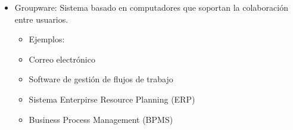 \begin{itemize}
\begin{itemize}
\begin{itemize}
        \item Groupware: Sistema basado en computadores que soportan la colaboración entre usuarios.
        \begin{itemize}
            \item Ejemplos:
            \item Correo electrónico
            \item Software de gestión de flujos de trabajo
            \item Sistema Enterpirse Resource Planning (ERP)
            \item Business Process Management (BPMS)
        \end{itemize}
    \end{itemize}
\end{itemize}
\end{itemize}
